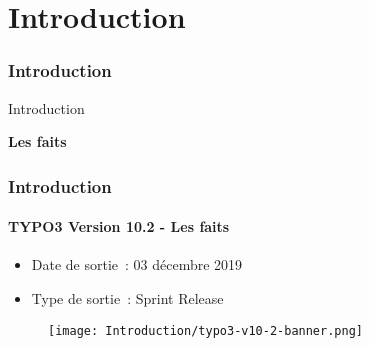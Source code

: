 %

\section{Introduction}
\begin{frame}[fragile]
	\frametitle{Introduction}

	\begin{center}\huge{Introduction}\end{center}
	\begin{center}\huge{\color{typo3darkgrey}\textbf{Les faits}}\end{center}

\end{frame}


\begin{frame}[fragile]
	\frametitle{Introduction}
	\framesubtitle{TYPO3 Version 10.2 - Les faits}

	\begin{itemize}
		\item Date de sortie~: 03 décembre 2019
		\item Type de sortie~: Sprint Release
	\end{itemize}

	\begin{figure}
		\texttt{[image: Introduction/typo3-v10-2-banner.png]}
	\end{figure}

\end{frame}


